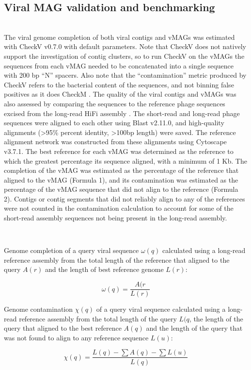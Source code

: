\subsection*{Viral MAG validation and benchmarking} \hfill\\
	The viral genome completion of both viral contigs and vMAGs was estimated with CheckV \cite{RN12} v0.7.0 with default parameters. Note that CheckV does not natively support the investigation of contig clusters, so to run CheckV on the vMAGs the sequences from each vMAG needed to be concatenated into a single sequence with 200 bp “N” spacers. Also note that the “contamination” metric produced by CheckV refers to the bacterial content of the sequences, and not binning false positives as it does CheckM \cite{RN13}. The quality of the viral contigs and vMAGs was also assessed by comparing the sequences to the reference phage sequences excised from the long-read HiFi assembly \cite{RN15}. The short-read and long-read phage sequences were aligned to each other using Blast \cite{RN2885} v2.11.0, and high-quality alignments (>95\% percent identity, >100bp length) were saved. The reference alignment network was constructed from these alignments using Cytoscape \cite{RN209} v3.7.1. The best reference for each vMAG was determined as the reference to which the greatest percentage its sequence aligned, with a minimum of 1 Kb. The completion of the vMAG was estimated as the percentage of the reference that aligned to the vMAG (Formula 1), and its contamination was estimated as the percentage of the vMAG sequence that did not align to the reference (Formula 2). Contigs or contig segments that did not reliably align to any of the references were not counted in the contamination calculation to account for some of the short-read assembly sequences not being present in the long-read assembly. 

\hfill\\
\begin{mycapequ}[!ht]
  \caption{Genome completion of a query viral sequence \(\omega (q)\) calculated using a long-read reference assembly from the total length of the reference that aligned to the query \(A(r)\) and the length of best reference genome \(L(r)\):}
  \begin{equation}
    \omega (q) = \frac{A(r}{L(r)}
  \end{equation}
\end{mycapequ}

\begin{mycapequ}[!ht]
  \caption{Genome contamination \(\chi (q)\) of a query viral sequence calculated using a long-read reference assembly from the total length of the query \(L(q\), the length of the query that aligned to the best reference \(A(q)\) and the length of the query that was not found to align to any reference sequence \(L(u)\):}
  \begin{equation}
    \chi (q) = \frac{L(q) - \sum A(q) - \sum L(u)}{L(q)}
  \end{equation}
\end{mycapequ}


